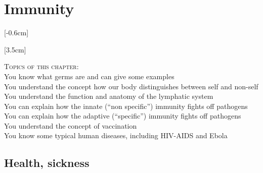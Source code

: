 %

\section{Immunity}\label{sec:immunity}

	[-0.6cm]


	 [3.5cm]


\begin{sloppypar}
  \begin{description}
\item \textsc{Topics of this chapter:}\\
You know what germs are and can give some examples\\
You understand the concept how our body distinguishes between self and non-self\\
You understand the function and anatomy of the lymphatic system\\
You can explain how the innate ("`non specific"') immunity fights off pathogens\\
You can explain how the adaptive ("`specific"') immunity fights off pathogens\\
You understand the concept of vaccination \\
You know some typical human diseases, including HIV-AIDS and Ebola\\
\end{description}
\end{sloppypar}


\subsection{Health, sickness}

